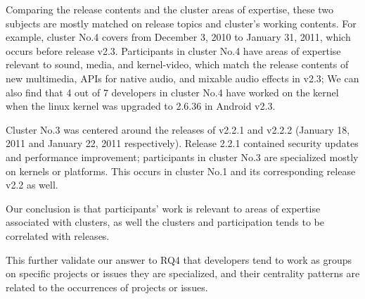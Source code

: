 \documentclass[conference]{IEEEtran}
\begin{document}
Comparing the release contents and the cluster areas of expertise, these two
subjects are mostly matched on release topics and cluster's working
contents. For example, cluster No.4 covers from December 3, 2010 to
January 31, 2011, which occurs before release v2.3. Participants in
cluster No.4 have areas of expertise relevant to sound, media, and kernel-video, which
match the release contents of new multimedia, APIs for native audio,
and mixable audio effects in v2.3; 
We can also find that 4 out of 7
developers in cluster No.4 have worked on the kernel when 
the linux kernel was upgraded to 2.6.36 in Android v2.3.

Cluster No.3 was centered around the releases of v2.2.1 and v2.2.2
(January 18, 2011 and January 22, 2011 respectively). Release 2.2.1
contained security updates and performance improvement; participants
in cluster No.3 are specialized mostly on kernels or platforms.  
This occurs in cluster
No.1 and its corresponding release v2.2 as well.


Our conclusion is that participants' work is relevant to areas of expertise
associated with clusters, as well the clusters and participation tends
to be correlated with releases.

This further validate our answer to RQ4 that developers tend to work as groups on specific projects or issues they are specialized, and their centrality patterns are related to the occurrences of projects or issues.

%
%
\end{document}
